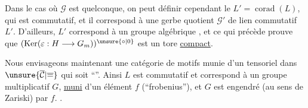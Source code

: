 Dans le cas où $\mathscr G$ est quelconque, on peut
définir cependant le  $L'=\operatorname{corad}(L)$, qui est
commutatif, et il correspond à une
gerbe quotient $\mathscr G'$ de lien commutatif $L'$.
D'ailleurs, $L'$ correspond à un groupe
algébrique , et ce qui précède prouve que
$(\operatorname{Ker}(\varepsilon:H\longrightarrow{}G_m))^{\unsure{\circ|0}}$ est un tore \uline{compact}.


Nous envisageons maintenant une 
catégorie de motifs munie d'un
  tensoriel dans $\unsure{\overline{\mathcal C}|\overline{=}}$
qui soit ``''. Ainsi $L$ est commutatif
et correspond à un groupe  
 multiplicatif $G$, \uline{muni} d'un
élément $f$ (``frobenius''), et $G$ est
engendré (au sens de Zariski) par
$f$. 
.

